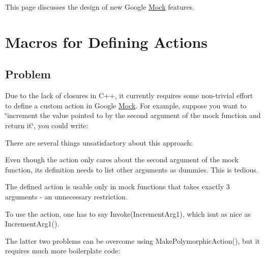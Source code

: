 This page discusses the design of new Google \mbox{\hyperlink{class_mock}{Mock}} features.

\section*{Macros for Defining Actions}

\subsection*{Problem}

Due to the lack of closures in C++, it currently requires some non-\/trivial effort to define a custom action in Google \mbox{\hyperlink{class_mock}{Mock}}. For example, suppose you want to \char`\"{}increment the value pointed to by the
second argument of the mock function and return it\char`\"{}, you could write\+:


\begin{DoxyCode}{0}
\DoxyCodeLine{\}}
\DoxyCodeLine{}
\end{DoxyCode}


There are several things unsatisfactory about this approach\+:


\begin{DoxyItemize}
\item Even though the action only cares about the second argument of the mock function, its definition needs to list other arguments as dummies. This is tedious.
\item The defined action is usable only in mock functions that takes exactly 3 arguments -\/ an unnecessary restriction.
\item To use the action, one has to say {\ttfamily Invoke(\+Increment\+Arg1)}, which isn\textquotesingle{}t as nice as {\ttfamily Increment\+Arg1()}.
\end{DoxyItemize}

The latter two problems can be overcome using {\ttfamily Make\+Polymorphic\+Action()}, but it requires much more boilerplate code\+:


\begin{DoxyCode}{0}
\DoxyCodeLine{  \}}
\DoxyCodeLine{\};}
\DoxyCodeLine{}
\DoxyCodeLine{\}}
\DoxyCodeLine{}
\end{DoxyCode}



